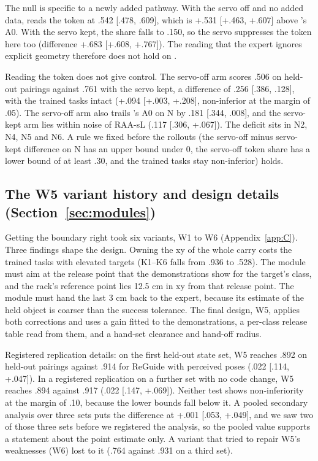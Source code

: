 The \pifive{} null is specific to a newly added pathway. With the servo off and no added data, \pizero{} reads the token at .542 [.478, .609], which is +.531 [+.463, +.607] above \pifive's A0. With the servo kept, the share falls to \mi.150, so the servo suppresses the token here too (difference +.683 [+.608, +.767]). The reading that the expert ignores explicit geometry therefore does not hold on \pizero.

Reading the token does not give control. The servo-off arm scores .506 on held-out pairings against .761 with the servo kept, a difference of \mi.256 [\mi.386, \mi.128], with the trained tasks intact (+.094 [+.003, +.208], non-inferior at the margin of \mi.05). The servo-off arm also trails \pifive's A0 on N by \mi.181 [\mi.344, \mi.008], and the servo-kept arm lies within noise of RAA-sL (\mi.117 [\mi.306, +.067]). The deficit sits in N2, N4, N5 and N6. A rule we fixed before the rollouts (the servo-off minus servo-kept difference on N has an upper bound under 0, the servo-off token share has a lower bound of at least .30, and the trained tasks stay non-inferior) holds.

\subsection{The W5 variant history and design details (Section~\ref{sec:modules})}
\label{app:L5}

Getting the boundary right took six variants, W1 to W6 (Appendix~\ref{app:C}). Three findings shape the design. Owning the xy of the whole carry costs the trained tasks with elevated targets (K1--K6 falls from .936 to .528). The module must aim at the release point that the demonstrations show for the target's class, and the rack's reference point lies 12.5 cm in xy from that release point. The module must hand the last 3 cm back to the expert, because its estimate of the held object is coarser than the success tolerance. The final design, W5, applies both corrections and uses a gain fitted to the demonstrations, a per-class release table read from them, and a hand-set clearance and hand-off radius.

Registered replication details: on the first held-out state set, W5 reaches .892 on held-out pairings against .914 for ReGuide with perceived poses (\mi.022 [\mi.114, +.047]). In a registered replication on a further set with no code change, W5 reaches .894 against .917 (\mi.022 [\mi.147, +.069]). Neither test shows non-inferiority at the margin of \mi.10, because the lower bounds fall below it. A pooled secondary analysis over three sets puts the difference at +.001 [\mi.053, +.049], and we saw two of those three sets before we registered the analysis, so the pooled value supports a statement about the point estimate only. A variant that tried to repair W5's weaknesses (W6) lost to it (.764 against .931 on a third set).

